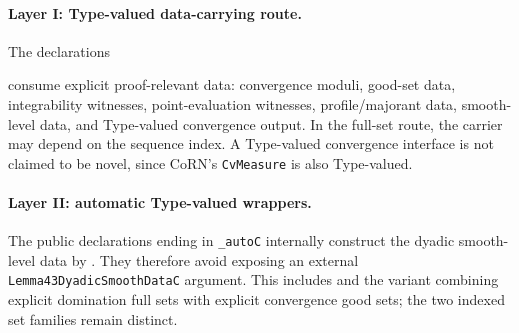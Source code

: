 \documentclass[11pt]{article}
\theoremstyle{definition}
\theoremstyle{remark}
\begin{document}
\paragraph{Layer I: Type-valued data-carrying route.}
The declarations
\begin{quote}\small\raggedright
{}\par
{}\par
{}\par
{}\par
{}\par
{}\par
{}\par
{}
\end{quote}
consume explicit proof-relevant data: convergence moduli, good-set data, integrability witnesses, point-evaluation witnesses, profile/majorant data, smooth-level data, and Type-valued convergence output.  In the full-set route, the carrier may depend on the sequence index.  A Type-valued convergence interface is not claimed to be novel, since CoRN's \texttt{CvMeasure} is also Type-valued.

\paragraph{Layer II: automatic Type-valued wrappers.}
The public declarations ending in \texttt{\_autoC} internally construct the dyadic smooth-level data by .  They therefore avoid exposing an external \texttt{Lemma43DyadicSmoothDataC} argument.  This includes  and the variant combining explicit domination full sets with explicit convergence good sets; the two indexed set families remain distinct.
\end{document}
